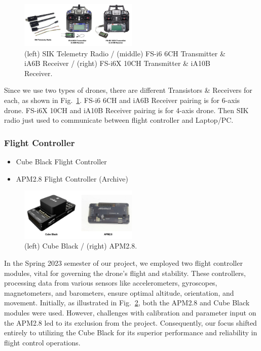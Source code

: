     \begin{figure}[H]
        \centerline{\includegraphics[width=0.5\textwidth]{Figures/Methods/Transistors&Receivers.png}}
        \caption{(left) SIK Telemetry Radio / (middle) FS-i6 6CH Transmitter \& iA6B Receiver / (right) FS-i6X 10CH Transmitter \& iA10B Receiver.}
        \label{fig2a2}
    \end{figure}

    Since we use two types of drones, there are different Transistors \& Receivers for each, as shown in Fig.~\ref{fig2a2}. FS-i6 6CH and iA6B Receiver pairing is for 6-axis drone. FS-i6X 10CH and iA10B Receiver pairing is for 4-axis drone. Then SIK radio just used to communicate between flight controller and Laptop/PC.
    
    \subsubsection{Flight Controller}\label{subsection:A3}
    \begin{itemize}
        \item Cube Black Flight Controller
        \item APM2.8 Flight Controller (Archive)
    \end{itemize}

    \begin{figure}[H]
        \centerline{\includegraphics[width=0.5\textwidth]{Figures/Methods/Flight_Controllers.png}}
        \caption{(left) Cube Black / (right) APM2.8.}
        \label{fig2a3}
    \end{figure}

   In the Spring 2023 semester of our project, we employed two flight controller modules, vital for governing the drone's flight and stability. These controllers, processing data from various sensors like accelerometers, gyroscopes, magnetometers, and barometers, ensure optimal altitude, orientation, and movement. Initially, as illustrated in Fig.~\ref{fig2a3}, both the APM2.8 and Cube Black modules were used. However, challenges with calibration and parameter input on the APM2.8 led to its exclusion from the project. Consequently, our focus shifted entirely to utilizing the Cube Black for its superior performance and reliability in flight control operations.
    
